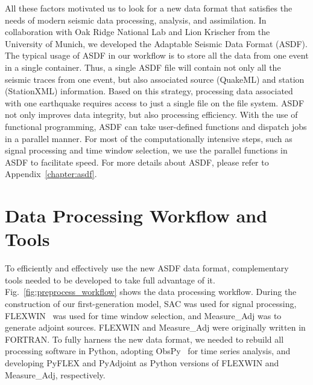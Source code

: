 All these factors motivated us to
look for a new data format that satisfies the needs of modern seismic data processing, analysis, and assimilation.
In collaboration with Oak Ridge National Lab and Lion Krischer from the University of Munich, we developed the Adaptable Seismic Data Format (ASDF).
The typical usage of ASDF in our workflow is to store all the data from one
event in a single container.
Thus, a single ASDF file will contain not only all the seismic traces from one
event, but also associated source (QuakeML) and station (StationXML) information.
Based on this strategy,
processing data associated with one earthquake requires access to just a single file on the file system.
ASDF not only improves data integrity, but also processing efficiency.
With the use of functional programming, ASDF can take user-defined functions and dispatch jobs in a parallel manner.
For most of the computationally intensive steps, such as signal
processing and time window selection, we use the parallel functions in ASDF
to facilitate speed.
For more details about ASDF, please refer to Appendix~\ref{chapter:asdf}.

\section{Data Processing Workflow and Tools}
\label{section:data_processing}

To efficiently and effectively use the new ASDF data format,
complementary tools needed to be developed to take full advantage of it.
Fig.~\ref{fig:preprocess_workflow} shows the data processing workflow.
During the construction of our first-generation model,
SAC was used for signal processing,
FLEXWIN~\cite{maggi2009automated} was used for time window selection,
and Measure\_Adj was to generate adjoint sources.
FLEXWIN and Measure\_Adj were originally written in FORTRAN.
To fully harness the new data format,
we needed to rebuild all processing software in Python,
adopting ObsPy~\cite{obspy2010} for time series analysis,
and developing PyFLEX and PyAdjoint as Python versions of FLEXWIN and Measure\_Adj,
respectively.


